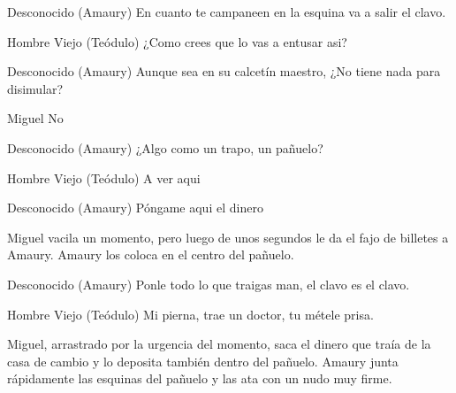 \begin{dialogue}{Desconocido (Amaury)}
En cuanto te campaneen en la esquina va a salir el clavo. 
\end{dialogue}

\begin{dialogue}{Hombre Viejo (Teódulo)}
¿Como crees que lo vas a entusar asi?
\end{dialogue}

\begin{dialogue}{Desconocido (Amaury)}
Aunque sea en su calcetín maestro, ¿No tiene nada para disimular?
\end{dialogue}

\begin{dialogue}{Miguel}
No
\end{dialogue}

\begin{dialogue}{Desconocido (Amaury)}
¿Algo como un trapo, un pañuelo?
\end{dialogue}

\begin{dialogue}{Hombre Viejo (Teódulo)}
A ver aqui
\end{dialogue}

\begin{dialogue}{Desconocido (Amaury)}
Póngame aqui el dinero
\end{dialogue}

\begin{scenedesc}
Miguel vacila un momento, pero luego de unos segundos le da el fajo de billetes a Amaury. Amaury los coloca en el centro del pañuelo.
\end{scenedesc}

\begin{dialogue}{Desconocido (Amaury)}
    Ponle todo lo que traigas man, el clavo es el clavo.
\end{dialogue}

\begin{dialogue}{Hombre Viejo (Teódulo)}
Mi pierna, trae un doctor, tu métele prisa.
\end{dialogue}

\begin{scenedesc}
Miguel, arrastrado por la urgencia del momento, saca el dinero que traía de la casa de cambio y lo deposita también dentro del pañuelo. Amaury junta rápidamente las esquinas del pañuelo y las ata con un nudo muy firme.
\end{scenedesc}

